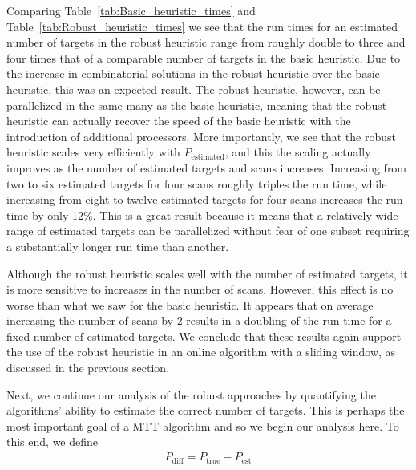 Comparing Table~\ref{tab:Basic_heuristic_times} and Table~\ref{tab:Robust_heuristic_times} we see that the run times for an estimated number of targets in the robust heuristic range from roughly double to three and four times that of a comparable number of targets in the basic heuristic. Due to the increase in combinatorial solutions in the robust heuristic over the basic heuristic, this was an expected result. The robust heuristic, however, can be parallelized in the same many as the basic heuristic, meaning that the robust heuristic can actually recover the speed of the basic heuristic with the introduction of additional processors. More importantly, we see that the robust heuristic scales very efficiently with $P_{\text{estimated}}$, and this the scaling actually improves as the number of estimated targets and scans increases. Increasing from two to six estimated targets for four scans roughly triples the run time, while increasing from eight to twelve estimated targets for four scans increases the run time by only 12\%. This is a great result because it means that a relatively wide range of estimated targets can be parallelized without fear of one subset requiring a substantially longer run time than another. 

Although the robust heuristic scales well with the number of estimated targets, it is more sensitive to increases in the number of scans. However, this effect is no worse than what we saw for the basic heuristic. It appears that on average increasing the number of scans by 2 results in a doubling of the run time for a fixed number of estimated targets. We conclude that these results again support the use of the robust heuristic in an online algorithm with a sliding window, as discussed in the previous section.
 
Next, we continue our analysis of the robust approaches by quantifying the algorithms' ability to estimate the correct number of targets. This is perhaps the most important goal of a MTT algorithm and so we begin our analysis here. To this end, we define
\begin{align}
	P_{\text{diff}} = P_{\text{true}} - P_{\text{est}}
\end{align}

